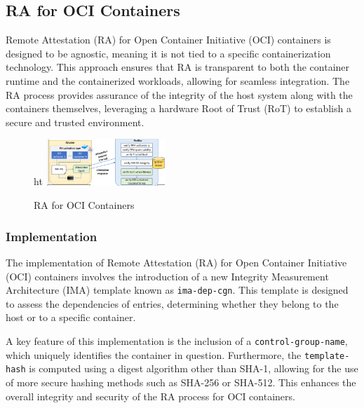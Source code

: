 \subsection{RA for OCI Containers}

Remote Attestation (RA) for Open Container Initiative (OCI) containers is designed to be agnostic, meaning it is not tied to a specific containerization technology. This approach ensures that RA is transparent to both the container runtime and the containerized workloads, allowing for seamless integration. The RA process provides assurance of the integrity of the host system along with the containers themselves, leveraging a hardware Root of Trust (RoT) to establish a secure and trusted environment.

\begin{figure}{ht}
    \centering
    \includegraphics[width=0.4\textwidth]{img/ra-oci.png}
    \caption{RA for OCI Containers}
\end{figure}


\subsubsection{Implementation}

The implementation of Remote Attestation (RA) for Open Container Initiative (OCI) containers involves the introduction of a new Integrity Measurement Architecture (IMA) template known as \texttt{ima-dep-cgn}. This template is designed to assess the dependencies of entries, determining whether they belong to the host or to a specific container. 

A key feature of this implementation is the inclusion of a \texttt{control-group-name}, which uniquely identifies the container in question. Furthermore, the \texttt{template-hash} is computed using a digest algorithm other than SHA-1, allowing for the use of more secure hashing methods such as SHA-256 or SHA-512. This enhances the overall integrity and security of the RA process for OCI containers.
